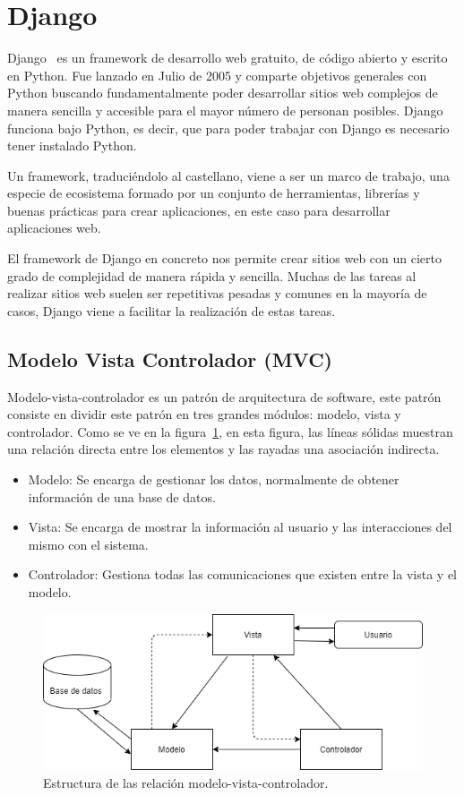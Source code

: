 \documentclass[a4paper, 12pt]{book}
\begin{document}
  
\section{Django}
\label{sec:django}
Django~\cite{django} es un framework de desarrollo web gratuito, de código abierto y escrito en Python. Fue lanzado en Julio de 2005 y comparte objetivos generales con Python buscando fundamentalmente poder desarrollar sitios web complejos de manera sencilla y accesible para el mayor número de personan posibles. Django funciona bajo Python, es decir, que para poder trabajar con Django es necesario tener instalado Python. 

Un framework, traduciéndolo al castellano, viene a ser un marco de trabajo, una especie de ecosistema formado por un conjunto de herramientas, librerías y buenas prácticas para crear aplicaciones, en este caso para desarrollar aplicaciones web. 

El framework de Django en concreto nos permite crear sitios web con un cierto grado de complejidad de manera rápida y sencilla. Muchas de las tareas al realizar sitios web suelen ser repetitivas pesadas y comunes en la mayoría de casos, Django viene a facilitar la realización de estas tareas. 

\subsection{Modelo Vista Controlador (MVC)}
\label{sec:modelo-vista-controlador}
Modelo-vista-controlador es un patrón de arquitectura de software, este patrón consiste en dividir este patrón en tres grandes módulos: modelo, vista y controlador. Como se ve en la figura~\ref{fig:arquitectura}, en esta figura, las líneas sólidas muestran una relación directa entre los elementos y las rayadas una asociación indirecta.

\begin{itemize}
 \item Modelo: Se encarga de gestionar los datos, normalmente de obtener información de una base de datos. 
 \item Vista: Se encarga de mostrar la información al usuario y las interacciones del mismo con el sistema. 
 \item Controlador: Gestiona todas las comunicaciones que existen entre la vista y el modelo. 
\end{itemize}

\begin{figure}
	\centering
	\includegraphics[width=12cm, keepaspectratio]{img/model-vista-controlador.png}
	\caption{Estructura de las relación modelo-vista-controlador.}
	\label{fig:arquitectura}
\end{figure}
\end{document}
